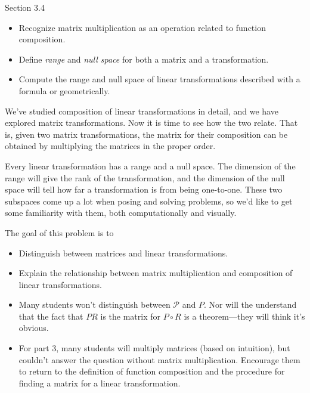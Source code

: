 \documentclass{problemset}
\begin{document}
\begin{lesson}

	Section 3.4

	\begin{itemize}
		\item Recognize matrix multiplication as an operation related to function composition.
		\item Define \emph{range} and \emph{null space} for both a matrix and a transformation.
		\item Compute the range and null space of linear transformations described
			with a formula or geometrically.
	\end{itemize}

		We've studied composition of linear transformations in detail, and we have explored
		matrix transformations. Now it is time to see how the two relate. That is, given
		two matrix transformations, the matrix for their composition can be obtained by
		multiplying the matrices in the proper order.

		Every linear transformation has a range and a null space. The dimension of the range
		will give the rank of the transformation, and the dimension of the null space
		will tell how far a transformation is from being one-to-one. These two subspaces come up
		a lot when posing and solving problems, so we'd like to get some familiarity with them,
		both computationally
		and visually.


\end{lesson}
	\question
	\begin{annotation}
		\begin{goals}

			The goal of this problem is to
			\begin{itemize}
				\item Distinguish between matrices and linear transformations.
				\item Explain the relationship between matrix multiplication and composition
					of linear transformations.
			\end{itemize}
		\end{goals}

		\begin{notes}
			\begin{itemize}
				\item Many students won't distinguish between $\mathcal P$ and $P$. Nor
					will the understand that the fact that $PR$ is the matrix for $P\circ R$
					is a theorem---they will think it's obvious.
				\item For part 3, many students will multiply matrices (based on intuition),
					but couldn't answer the question without matrix multiplication. Encourage
					them to return to the definition of function composition and the procedure
					for finding a matrix for a linear transformation.
			\end{itemize}
		\end{notes}
	\end{annotation}
\end{document}
